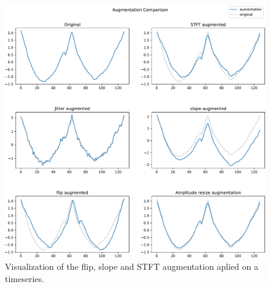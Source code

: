 \begin{figure}
    \centering
    \includegraphics[width=\textwidth]{figures/figure-pdf/Augmentations.pdf}
    \caption{Visualization of the flip, slope and STFT augmentation aplied on a timeseries. }
\end{figure}
